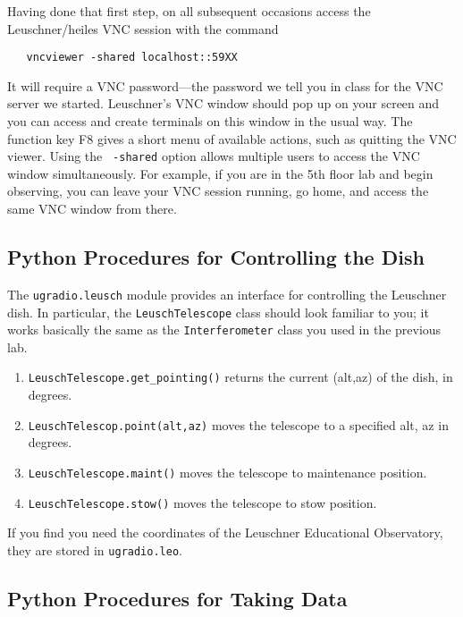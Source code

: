 \documentclass[psfig,preprint]{aastex}
\begin{document}
Having done that first step, on all subsequent occasions access the
Leuschner/heiles VNC session with the command
\begin{verbatim}
   vncviewer -shared localhost::59XX
\end{verbatim}
\noindent It will require a VNC password---the password we tell you in class
for the VNC server we started.  Leuschner's VNC window should pop
up on your screen and you can access and create terminals on this
window in the usual way. The function key F8 gives a short menu of
available actions, such as quitting the VNC viewer. Using the {\tt
  -shared} option allows multiple users to access the VNC window
simultaneously. For example, if you are in the 5th floor lab and begin
observing, you can leave your VNC session running, go home,
and access the same VNC window from there. 

\subsection{Python Procedures for Controlling the Dish}

The {\tt ugradio.leusch} module provides an interface for controlling
the Leuschner dish.  In particular, the {\tt LeuschTelescope} class should
look familiar to you; it works basically the same as the {\tt Interferometer}
class you used in the previous lab.
\begin{enumerate}
\item {\tt LeuschTelescope.get\_pointing()} returns the current (alt,az) of the dish, in degrees.
\item {\tt LeuschTelescop.point(alt,az)} moves the telescope to a specified alt, az in degrees.
\item {\tt LeuschTelescope.maint()} moves the telescope to maintenance position.
\item {\tt LeuschTelescope.stow()} moves the telescope to stow position.
\end{enumerate}

If you find you need the coordinates of the Leuschner Educational Observatory, they are stored in
{\tt ugradio.leo}.

\subsection{Python Procedures for Taking Data}
\end{document}
